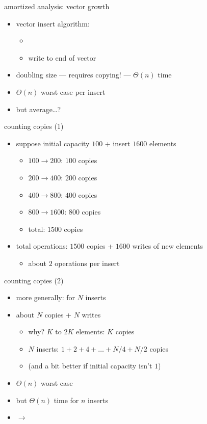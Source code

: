 \begin{frame}{amortized analysis: vector growth}
    \begin{itemize}
    \item vector insert algorithm:
        \begin{itemize}
        \item {}
        \item write to end of vector
        \end{itemize}
    \item<2-> doubling size --- requires copying! --- $\Theta(n)$ time
    \item<2-> $\Theta(n)$ worst case per insert
    \item<2-> but average\ldots?
    \end{itemize}
\end{frame}

\begin{frame}{counting copies (1)}
    \begin{itemize}
    \item suppose initial capacity $100$ + insert $1600$ elements
    \begin{itemize}
        \item $100\rightarrow 200$: $100$ copies
        \item $200\rightarrow 400$: $200$ copies
        \item $400\rightarrow 800$: $400$ copies
        \item $800\rightarrow 1600$: $800$ copies
        \item total: $1500$ copies
    \end{itemize}
    \item total operations: $1500$ copies + $1600$ writes of new elements
        \begin{itemize}
        \item about $2$ operations per insert
        \end{itemize}
    \end{itemize}
\end{frame}

\begin{frame}{counting copies (2)}
    \begin{itemize}
    \item more generally: for $N$ inserts
    \item about $N$ copies + $N$ writes
        \begin{itemize}
        \item why? $K$ to $2K$ elements: $K$ copies
        \item $N$ inserts: $1 + 2 + 4 + \ldots + N/4 + N/2$ copies
        \item (and a bit better if initial capacity isn't $1$)
        \end{itemize}
    \item $\Theta(n)$ worst case
    \item but $\Theta(n)$ time for $n$ inserts
    \item $\rightarrow$ 
    \end{itemize}
\end{frame}
